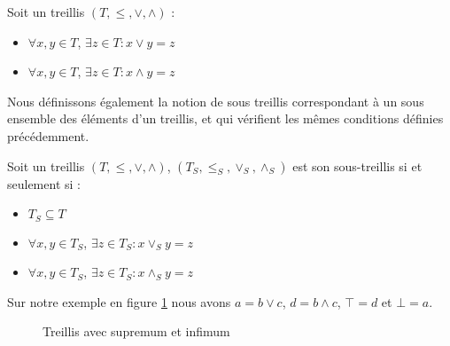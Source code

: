 \begin{definition}[Treillis]
Soit un treillis $(T, \leq, \vee, \wedge)$ :
\begin{itemize}
	\item $\forall x, y \in T$, $\exists z \in T : x \vee y = z$
	\item $\forall x, y \in T$, $\exists z \in T : x \wedge y = z$
\end{itemize}
\end{definition}

Nous définissons également la notion de sous treillis correspondant à un sous ensemble des éléments d'un treillis, et qui vérifient les mêmes conditions définies précédemment.

\begin{definition}
Soit un treillis $(T, \leq, \vee, \wedge)$, $(T_S, \leq_S, \vee_S, \wedge_S)$ est son sous-treillis si et seulement si :
\begin{itemize}
	\item $T_S \subseteq T$
	\item $\forall x, y \in T_S$, $\exists z \in T_S : x \vee_S y = z$
	\item $\forall x, y \in T_S$, $\exists z \in T_S : x \wedge_S y = z$
\end{itemize}
\end{definition}

Sur notre exemple en figure \ref{treillis_sup_inf} nous avons $a = b \vee c$, $d = b \wedge c$, $\top = d$ et $\bot = a$.

\begin{figure}[H]
	\begin{minipage}{0.5\textwidth}
	\begin{center}
	\end{center}
	\end{minipage}
	\begin{minipage}{0.5\textwidth}
	\begin{center}
	\end{center}
	\end{minipage}
	\caption{Treillis avec supremum et infimum}
	\label{treillis_sup_inf}
\end{figure}

